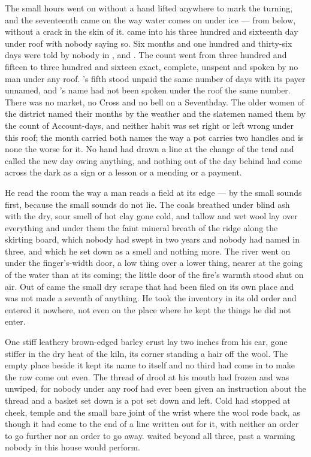 
The small hours went on without a hand lifted anywhere to mark the turning, and the seventeenth came on the way water comes on under ice --- from below, without a crack in the skin of it.  came into his three hundred and sixteenth day under  roof with nobody saying so. Six months and one hundred and thirty-six days were told by nobody in ,  and . The count went from three hundred and fifteen to three hundred and sixteen exact, complete, unspent and spoken by no man under any roof. 's fifth stood unpaid the same number of days with its payer unnamed, and 's name had not been spoken under the roof the same number. There was no market, no Cross and no bell on a Seventhday. The older women of the district named their months by the weather and the slatemen named them by the count of Account-days, and neither habit was set right or left wrong under this roof; the month carried both names the way a pot carries two handles and is none the worse for it. No hand had drawn a line at the change of the tend and called the new day owing anything, and nothing out of the day behind had come across the dark as a sign or a lesson or a mending or a payment.

He read the room the way a man reads a field at its edge --- by the small sounds first, because the small sounds do not lie. The coals breathed under blind ash with the dry, sour smell of hot clay gone cold, and tallow and wet wool lay over everything and under them the faint mineral breath of the  ridge along the skirting board, which nobody had swept in two years and nobody had named in three, and which he set down as a smell and nothing more. The river went on  under the finger's-width door, a low thing over a lower thing, nearer at the going of the water than at its coming; the little door of the fire's warmth stood shut on air. Out of  came the small dry scrape that had been filed on its own place and was not made a seventh of anything. He took the inventory in its old order and entered it nowhere, not even on the place where he kept the things he did not enter.

One stiff leathery brown-edged barley crust lay two inches from his ear, gone stiffer in the dry heat of the kiln, its corner standing a hair off the wool. The empty place beside it kept its name to itself and no third had come in to make the row come out even. The thread of drool at his mouth had frozen and was unwiped, for nobody under any roof had ever been given an instruction about the thread and a basket set down is a pot set down and left. Cold had stopped at cheek, temple and the small bare joint of the wrist where the wool rode back, as though it had come to the end of a line written out for it, with neither an order to go further nor an order to go away.  waited beyond all three, past a warming nobody in this house would perform.

